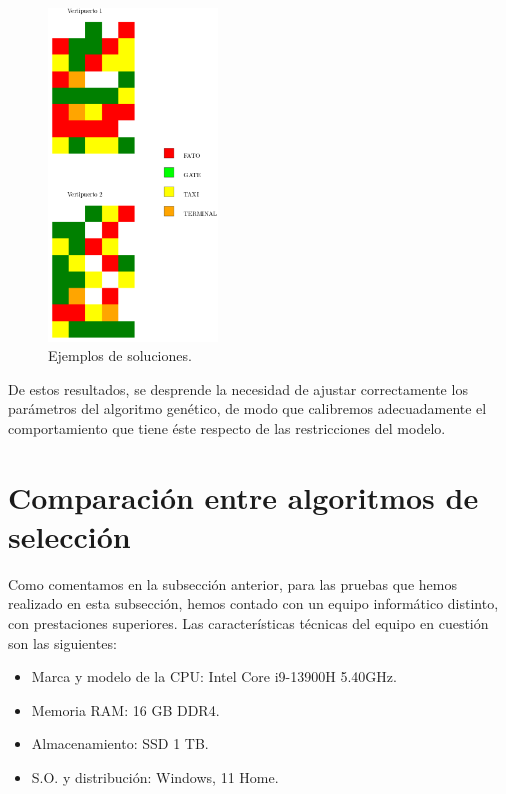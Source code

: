 \documentclass[12pt,a4paper]{book}
\begin{document}
	\begin{figure}[h] 
    	\begin{center}
    	\includegraphics[width=0.4\textwidth]{img/vertis.png}
    	\end{center}
    	\caption{Ejemplos de soluciones.}
    	\label{fig:verti1}
	\end{figure}

De estos resultados, se desprende la necesidad de ajustar correctamente los parámetros del algoritmo genético, de modo que calibremos adecuadamente el comportamiento que tiene éste respecto de las restricciones del modelo. 



\section{Comparación entre algoritmos de selección} \label{Subsec: 5_3}
Como comentamos en la subsección anterior, para las pruebas que hemos realizado en esta subsección, hemos contado con un equipo informático distinto, con prestaciones superiores. Las características técnicas del equipo en cuestión son las siguientes:  
\begin{itemize}
	\item Marca y modelo de la CPU: Intel Core i9-13900H 5.40GHz.
	\item Memoria RAM: 16 GB DDR4.
	\item Almacenamiento: SSD 1 TB.
	\item S.O. y distribución: Windows, 11 Home.
\end{itemize}
\end{document}

